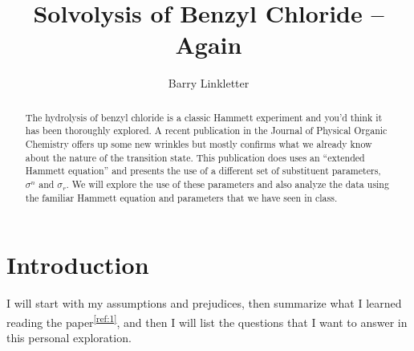 \documentclass{tufte-handout}
\title{Solvolysis of Benzyl Chloride -- Again}
\author[Barry Linkletter]{Barry Linkletter}
\date{} %
\newcommand{\tss}[1]{\textsuperscript{#1}}
\begin{document}
\justifying


\maketitle%

\begin{abstract}


\noindent The hydrolysis of benzyl chloride is a classic Hammett experiment and you'd think it has been thoroughly explored. A recent publication in the Journal of Physical Organic Chemistry offers up some new wrinkles but mostly confirms what we already know about the nature of the transition state. 
This publication does uses an ``extended Hammett equation'' and presents the use of a different set of substituent parameters, $\sigma^n$ and $\sigma_r$. We will explore the use of these parameters and also analyze the data using the familiar Hammett equation and parameters that we have seen in class.


\end{abstract}

\section{Introduction}




I will start with my assumptions and prejudices, then summarize what I learned reading the paper\tss{\ref{ref:1}}, and then I will list the questions that I want to answer in this personal exploration.
\end{document}
